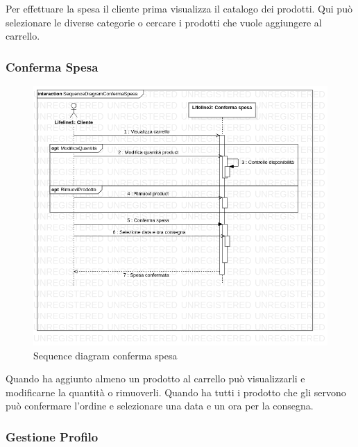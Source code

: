 \documentclass[12pt, a4paper]{report}
\begin{document}
Per effettuare la spesa il cliente prima visualizza il catalogo dei prodotti. Qui
può selezionare le diverse categorie o cercare i prodotti che vuole aggiungere 
al carrello.

\newpage

\subsubsection{Conferma Spesa}

\begin{figure}[h]
  \centering
  \includegraphics[width=\textwidth]{Use Case Model!Conferma spesa!InteractionConfermaSpesa!SequenceDiagramConfermaSpesa_13.png}
  \caption{Sequence diagram conferma spesa}
\end{figure}

Quando ha aggiunto almeno un prodotto al carrello può visualizzarli e modificarne
la quantità o rimuoverli. Quando ha tutti i prodotto che gli servono può confermare
l'ordine e selezionare una data e un ora per la consegna.

\newpage

\subsubsection{Gestione Profilo}
\end{document}
